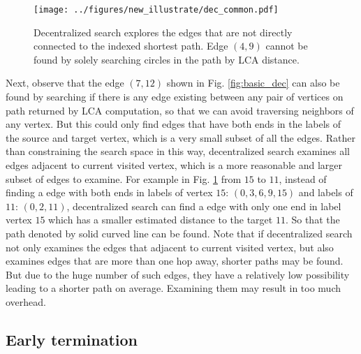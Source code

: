
\begin{figure}[t]
    \centering
    \texttt{[image: ../figures/new\_illustrate/dec\_common.pdf]}
    \caption{Decentralized search explores the edges that are not directly connected to the indexed shortest path. Edge $(4, 9)$ cannot be found by solely searching circles in the path by LCA distance.}
    \label{fig:dec_common}
\end{figure}

Next, observe that the edge $(7,12)$ shown in Fig. \ref{fig:basic_dec} can also be found by searching if there is any edge existing between any pair of vertices on path returned by LCA computation, so that we can avoid traversing neighbors of any vertex. But this could only find edges that have both ends in the labels of the source and target vertex, which is a very small subset of all the edges. Rather than constraining the search space in this way, decentralized search examines all edges adjacent to current visited vertex, which is a more reasonable and larger subset of edges to examine. For example in Fig. \ref{fig:dec_common} from $15$ to $11$, instead of finding a edge with both ends in labels of vertex $15$: $(0, 3, 6, 9, 15)$ and labels of $11$: $(0, 2, 11)$, decentralized search can find a edge with only one end in label vertex $15$ which has a smaller estimated distance to the target $11$. So that the path denoted by solid curved line can be found. Note that if decentralized search not only examines the edges that adjacent to current visited vertex, but also examines edges that are more than one hop away, shorter paths may be found. But due to the huge number of such edges, they have a relatively low possibility leading to a shorter path on average. Examining them may result in too much overhead. 

\subsection{Early termination}

